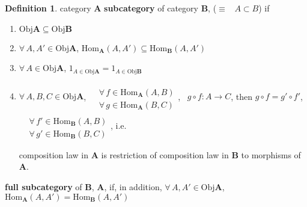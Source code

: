 \documentclass[twoside,landscape,10pt]{amsart}
\theoremstyle{plain}
\theoremstyle{definition}
\newtheorem{definition}{Definition}
\theoremstyle{remark}
\begin{document}
\begin{multicols*}{2}
\begin{definition}
  category $\mathbf{A}$ \textbf{subcategory} of category $\mathbf{B}$, ($\equiv $ \quad \, $A\subset B$) if
\begin{enumerate}
  \item $\text{Obj}\mathbf{A} \subseteq \text{Obj}\mathbf{B}$ 
  \item $\forall \, A,A' \in \text{Obj}\mathbf{A}$, $\text{Hom}_{\mathbf{A}}(A,A') \subseteq \text{Hom}_{\mathbf{B}}(A,A')$ 
  \item $\forall \, A \in \text{Obj}\mathbf{A}$, $1_{A\in \text{Obj}\mathbf{A}} = 1_{A \in \text{Obj}\mathbf{B}}$
  \item $\forall \, A,B, C \in \text{Obj}\mathbf{A}$, $\begin{aligned} & \quad \\
    & \forall \, f \in \text{Hom}_{\mathbf{A}}(A,B) \\ 
& \forall \, g \in \text{Hom}_{\mathbf{A}}(B,C)  \end{aligned}$, \, $g\circ f: A \to C$, then $g\circ f = g'\circ f'$, $\begin{aligned} & \quad \\
    & \forall \, f' \in \text{Hom}_{\mathbf{B}}(A,B) \\ 
& \forall \, g' \in \text{Hom}_{\mathbf{B}}(B,C)  \end{aligned}$, i.e. 

composition law in $\mathbf{A}$ is restriction of composition law in $\mathbf{B}$ to morphisms of $\mathbf{A}$.  
\end{enumerate}

\textbf{full subcategory} of $\mathbf{B}$, $\mathbf{A}$, if, in addition, $\forall \, A,A' \in \text{Obj}\mathbf{A}$, $\text{Hom}_{\mathbf{A}}(A,A') = \text{Hom}_{\mathbf{B}}(A,A')$
\end{definition}


\end{multicols*}
\end{document}
